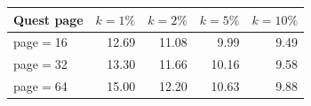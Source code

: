 \begin{tabular}{l r r r r}
\toprule
Quest page & $k{=}1\%$ & $k{=}2\%$ & $k{=}5\%$ & $k{=}10\%$ \\
\midrule
page$=$16 & 12.69 & 11.08 & 9.99 & 9.49 \\
page$=$32 & 13.30 & 11.66 & 10.16 & 9.58 \\
page$=$64 & 15.00 & 12.20 & 10.63 & 9.88 \\
\bottomrule
\end{tabular}

